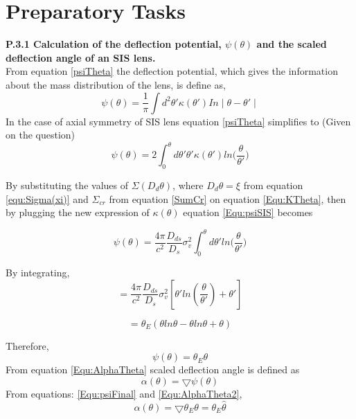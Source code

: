 \section{Preparatory Tasks}
\textbf{ P.3.1 Calculation of the deflection potential, $\psi(\theta) $ and the scaled deflection angle of an SIS lens.}\\
 
 \noindent
 From equation \ref{psiTheta} the deflection potential, which gives the information about the mass distribution of the lens, is define as,
 \begin{equation}
 \psi(\theta)=\frac{1}{\pi}\int d^2\theta'\kappa(\theta')In \mid \theta-\theta'\mid 
 \end{equation}
 In the case of axial symmetry of SIS lens equation \ref{psiTheta} simplifies to (Given on the question)
 \begin{equation}
 \psi(\theta)=2\int_{0}^{\theta}d\theta' \theta'\kappa(\theta')ln \bigg(\frac{\theta}{\theta'}\bigg)
 \label{Equ:psiSIS}
 \end{equation}

 By substituting the values of $ \Sigma(D_{d}\theta) $, where $ D_{d}\theta=\xi $ from equation \ref{equ:Sigma(xi)} and  $ \Sigma_{cr} $ from equation \ref{SumCr} on equation \ref{Equ:KTheta}, then by plugging the new expression of  $ \kappa(\theta) $ equation \ref{Equ:psiSIS} becomes
 
 
 \begin{equation}
 \psi(\theta)=\frac{4\pi}{c^2}\frac{D_{ds}}{D_{s}}\sigma^2_{v}\int_{0}^{\theta}d\theta' ln \bigg(\frac{\theta}{\theta'}\bigg)
 \end{equation}
 
 By integrating,
 \begin{equation}
 =\frac{4\pi}{c^2}\frac{D_{ds}}{D_{s}}\sigma^2_{v}[\theta'ln(\frac{\theta}{\theta'})+\theta']
 \end{equation}
 
 \begin{equation}
 =\theta_{E}(\theta ln \theta - \theta ln \theta + \theta )
 \end{equation}
 
 Therefore, 
 \begin{equation}
 \psi(\theta)=\theta_{E}\theta 
 \label{Equ:psiFinal}
 \end{equation}
 From equation \ref{Equ:AlphaTheta} scaled deflection angle is defined as
 \begin{equation}
 \alpha(\theta)=\bigtriangledown\psi(\theta)
 \label{Equ:AlphaTheta2}
 \end{equation}
 From equations: \ref{Equ:psiFinal} and \ref{Equ:AlphaTheta2},
 \begin{equation}
 \alpha(\theta)=\bigtriangledown \theta_{E}\theta = \theta_{E}\hat{\theta}
 \label{Equ:AlphaThetaFinal}
 \end{equation}
 \\
 
